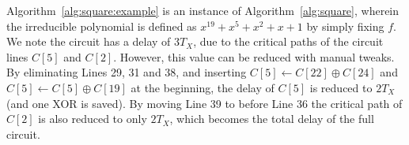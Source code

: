 \documentclass{ufscThesis}
\begin{document}
Algorithm~\ref{alg:square:example} is an instance of Algorithm~\ref{alg:square}, wherein the irreducible polynomial is defined as $x^{19}+x^5+x^2+x+1$ by simply fixing $f$. We note the circuit has a delay of $3T_X$, due to the critical paths of the circuit lines $C[5]$ and $C[2]$. However, this value can be reduced with manual tweaks. By eliminating Lines 29, 31 and 38, and inserting $C[5] \leftarrow C[22] \oplus C[24]$ and $C[5] \leftarrow C[5] \oplus C[19]$ at the beginning, the delay of $C[5]$ is reduced to $2 T_X$ (and one XOR is saved). By moving Line 39 to before Line 36 the critical path of $C[2]$ is also reduced to only $2 T_X$, which becomes the total delay of the full circuit.
\end{document}
